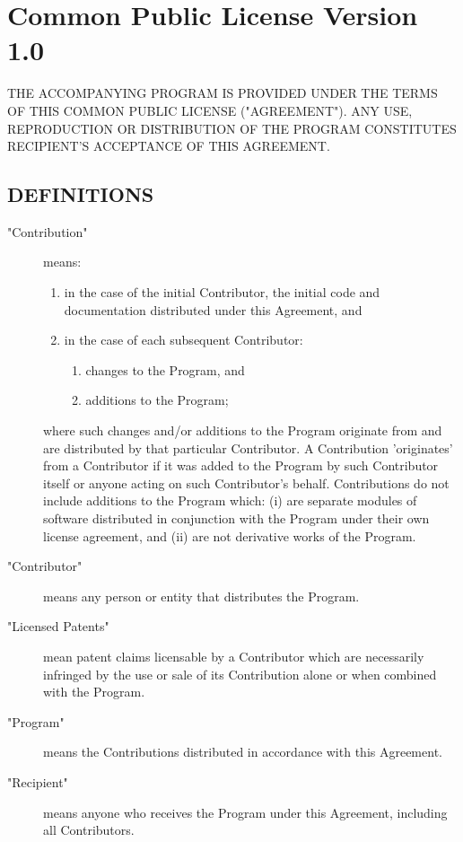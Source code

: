 \chapter{Common Public License Version 1.0}


THE ACCOMPANYING PROGRAM IS PROVIDED UNDER THE TERMS OF THIS COMMON PUBLIC  LICENSE ("AGREEMENT"). ANY USE, REPRODUCTION OR DISTRIBUTION OF THE PROGRAM  CONSTITUTES RECIPIENT'S ACCEPTANCE OF THIS AGREEMENT.


\section{DEFINITIONS}

\begin{description}
\item["Contribution"] means:

\begin{enumerate}[a]
\item
in the case of the initial Contributor, the initial code and documentation  distributed under this Agreement, and


\item
in the case of each subsequent Contributor:

\begin{enumerate}%

\item
changes to the Program, and

\item
additions to the Program;
\end{enumerate}
\end{enumerate}

where such changes and/or additions to the Program originate from and are  distributed by that particular Contributor. A Contribution 'originates' from a  Contributor if it was added to the Program by such Contributor itself or anyone  acting on such Contributor's behalf. Contributions do not include additions to the Program which: (i) are separate modules of software distributed in  conjunction with the Program under their own license agreement, and (ii) are  not derivative works of the Program.

\item["Contributor"] means any person or entity that distributes the Program.


\item["Licensed Patents"] mean patent claims licensable by a Contributor which are  necessarily infringed by the use or sale of its Contribution alone or when  combined with the Program.


\item["Program"] means the Contributions distributed in accordance with this Agreement.


\item["Recipient"] means anyone who receives the Program under this Agreement, including all Contributors.
\end{description}

